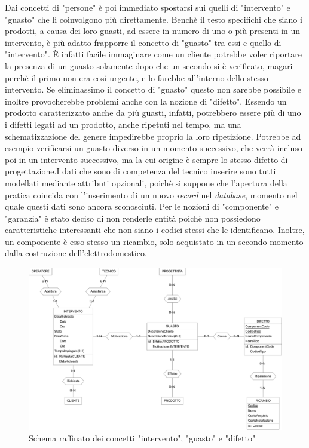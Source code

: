 \documentclass[a4paper, 12pt]{report}
\begin{document}
Dai concetti di "persone" è poi immediato spostarsi sui quelli di "intervento" e "guasto" che li coinvolgono più direttamente. Benchè il testo
specifichi che siano i prodotti, a causa dei loro guasti, ad essere in numero di uno o più presenti in un intervento, è più adatto frapporre il
concetto di "guasto" tra essi e quello di "intervento". È infatti facile immaginare come un cliente potrebbe voler riportare la presenza
di un guasto solamente dopo che un secondo si è verificato, magari perchè il primo non era così urgente, e lo farebbe all'interno dello stesso intervento.
Se eliminassimo il concetto di "guasto" questo non sarebbe possibile e inoltre provocherebbe problemi anche con la nozione di "difetto". Essendo
un prodotto caratterizzato anche da più guasti, infatti, potrebbero essere più di uno i difetti legati ad un prodotto, anche ripetuti nel tempo,
ma una schematizzazione del genere impedirebbe proprio la loro ripetizione. Potrebbe ad esempio verificarsi un guasto diverso in un momento successivo,
che verrà incluso poi in un intervento successivo, ma la cui origine è sempre lo stesso difetto di progettazione.\newline I dati che sono di competenza del tecnico
inserire sono tutti modellati mediante attributi opzionali, poichè si suppone che l'apertura della pratica coincida con l'inserimento di un nuovo
\textit{record} nel \textit{database}, momento nel quale questi dati sono ancora sconosciuti. Per le nozioni di "componente" e "garanzia" è stato
deciso di non renderle entità poichè non possiedono caratteristiche interessanti che non siano i codici stessi che le identificano. Inoltre, un componente
è esso stesso un ricambio, solo acquistato in un secondo momento dalla costruzione dell'elettrodomestico.

\begin{figure}[H]
	\centering
	\includegraphics[width=\linewidth]{images/interventi.png}
	\caption{Schema raffinato dei concetti "intervento", "guasto" e "difetto"}
\end{figure}
\end{document}
